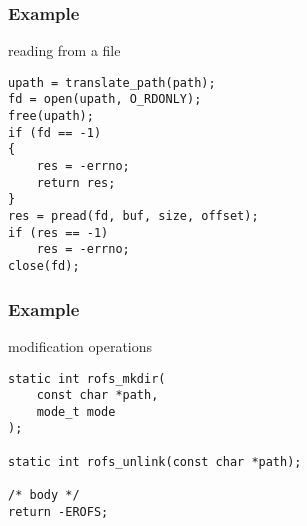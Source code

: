 \documentclass[dvipsnames]{beamer}
\begin{document}
\begin{frame}[fragile]
  \frametitle{Example}

  \begin{exampleblock}{reading from a file}
    \begin{lstlisting}
upath = translate_path(path);
fd = open(upath, O_RDONLY);
free(upath);
if (fd == -1)
{
    res = -errno;
    return res;
}
res = pread(fd, buf, size, offset);
if (res == -1)
    res = -errno;
close(fd);
    \end{lstlisting}
  \end{exampleblock}
\end{frame}

\begin{frame}[fragile]
  \frametitle{Example}

  \begin{exampleblock}{modification operations}
    \begin{lstlisting}
static int rofs_mkdir(
    const char *path,
    mode_t mode
);

static int rofs_unlink(const char *path);

/* body */
return -EROFS;
    \end{lstlisting}
  \end{exampleblock}
\end{frame}
\end{document}
